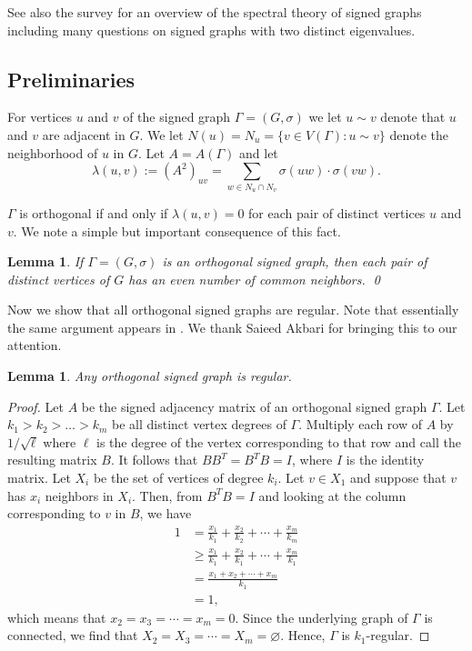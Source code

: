 \documentclass[11pt]{article}
\theoremstyle{plain}
\newtheorem{lemma}[theorem]{Lemma}
\theoremstyle{definition}
\begin{document}
See also the survey \cite{Bel} for an overview of the spectral theory of signed graphs including many questions on signed graphs with two distinct eigenvalues.


\subsection{Preliminaries}\label{sec:prelim}
For vertices $u$ and $v$ of the signed graph $\Gamma=(G,\sigma)$ we let $u\sim v$ denote that $u$ and $v$ are adjacent in $G$. We let $N(u)=N_u=\{v\in V(\Gamma): u\sim v\}$ denote the neighborhood of $u$ in $G$. Let $A=A(\Gamma)$ and let \[\lambda(u,v):=(A^2)_{uv}=\sum_{w\in N_u\cap N_v} \sigma(uw)
\cdot \sigma(vw).\]


$\Gamma$ is orthogonal if and only if  $\lambda(u,v)=0$ for each pair of distinct vertices $u$ and $v$. We note a simple but important consequence of this fact. 

\begin{lemma}\label{Lem:evencommon}
    If $\Gamma=(G,\sigma)$ is an orthogonal signed graph, then each pair of distinct vertices of $G$ has an even number of common neighbors. \qed
\end{lemma}

Now we show that all orthogonal signed graphs are regular. Note that essentially the same argument appears in \cite{CS}. We thank Saieed Akbari for bringing this to our attention.


\begin{lemma}\label{regulareven}
Any orthogonal signed graph is regular.
\end{lemma}


\begin{proof}
Let $A$ be the  signed adjacency matrix of an orthogonal signed graph  $\Gamma$. Let $k_1> k_2>\dots> k_m$ be  all distinct vertex degrees of $\Gamma$.
Multiply  each row  of  $A$ by $1/\sqrt{\ell}$ where $\ell$ is the degree of the vertex corresponding to that row and call the resulting matrix $B$. It follows that $BB^T=B^TB=I$, where
$I$ is the identity matrix.
 Let $X_i$ be the set of vertices of degree $k_i$. Let $v\in X_1$ and suppose that $v$ has $x_i$ neighbors in $X_i$. Then, from  $B^TB=I$ and looking at the column corresponding to $v$ in $B$,
  we have
  \begin{align*}
 1&=\frac{x_1}{k_1}+\frac{x_2}{k_2}+\cdots+\frac{x_m}{k_m}\\
 &\geqslant\frac{x_1}{k_1}+\frac{x_2}{k_1}+\cdots+\frac{x_m}{k_1}\\
 &=\frac{x_1+x_2+\cdots+x_m}{k_1}\\
 &=1,
 \end{align*}
which means that  $x_2=x_3=\cdots=x_m=0$. Since the underlying graph of $\Gamma$ is connected, we find that  $X_2=X_3=\cdots=X_m=\varnothing$. Hence,
$\Gamma$ is $k_1$-regular.
\end{proof}
\end{document}
